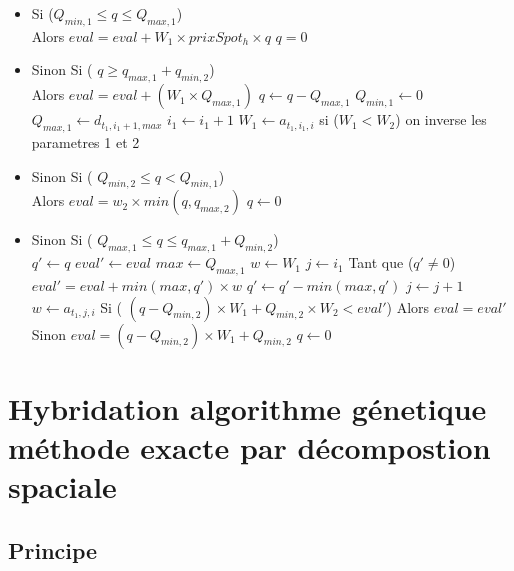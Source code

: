 \documentclass[a4paper]{report}
\begin{document}
\begin{itemize}
  \item Si ($Q_{min,1}\leq q \leq Q_{max,1}$)\\
  \subitem Alors $eval = eval+ W_1 \times prixSpot_h \times q$
  \subitem $q=0$\\
  \item Sinon Si ( $q\geq q_{max,1}+q_{min,2}$)\\
  \subitem Alors $eval= eval +(W_1 \times Q_{max,1})$ 
  \subitem $q\leftarrow  q - Q_{max,1}$
  \subitem  $Q_{min,1}\leftarrow 0$
  \subitem $Q_{max,1} \leftarrow d_{t_1,i_1+1,max}$
  \subitem $i_1\leftarrow  i_1 +1$
  \subitem $W_1\leftarrow  a_{t_1,i_1,i}$
  \subitem si ($W_1<W_2$) on inverse les parametres 1 et 2\\
  
  \item Sinon Si ( $Q_{min,2}\leq q  < Q_{min,1}$)\\
  
  \subitem  Alors $eval= w_2 \times min(q,q_{max,2})$
  \subitem $q\leftarrow 0$\\
  
 \item Sinon Si ( $Q_{max,1} \leq q \leq q_{max,1} + Q_{min,2}$)\\
 \subitem $q'\leftarrow  q$
  \subitem $ eval'\leftarrow eval$
  \subitem $max \leftarrow Q_{max,1}$
  \subitem $w \leftarrow W_1$
  \subitem $j\leftarrow i_1$ 
  \subitem Tant que ($q'\neq 0$)
  \subsubitem $eval'= eval + min(max,q')\times w$
    \subsubitem $q'\leftarrow q'-min(max,q')$
    \subitem $j\leftarrow j+1$
    \subsubitem $w\leftarrow a_{t_1,j,i}$
 \subitem Si ( $(q-Q_{min,2})\times W_1 + Q_{min,2}\times W_2< eval'$)
\subsubitem Alors $eval= eval'$
\subitem Sinon $eval = (q-Q_{min,2})\times W_1 + Q_{min,2}$
\subitem $q\leftarrow 0$
\end{itemize}
\section{Hybridation algorithme génetique méthode exacte par décompostion spaciale}
\subsection{Principe}
\end{document}

